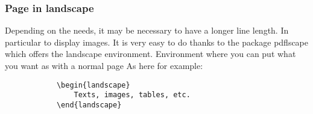 \begin{landscape}
    \subsubsection{Page in landscape}
    Depending on the needs, it may be necessary to have a longer line length. In particular to display images.
    It is very easy to do thanks to the package pdflscape which offers the landscape environment. Environment where you can put what you want as with a normal page
    As here for example:
    \begin{code}
        \begin{verbatim}
            \begin{landscape}
                Texts, images, tables, etc.
            \end{landscape}
    \end{verbatim}
        \caption{Use of landscape}
    \end{code}
\end{landscape}